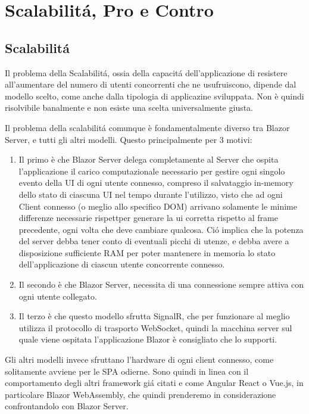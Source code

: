 \chapter{Scalabilit\'a, Pro e Contro}\label{cap:scalprocont}
\section{Scalabilit\'a}\label{sez:scalabilita}
Il problema della Scalabilit\'a, ossia della capacit\'a dell'applicazione di resistere all'aumentare del numero di utenti concorrenti che ne usufruiscono, dipende dal modello scelto, come anche dalla tipologia di applicazine sviluppata.
Non \`e quindi risolvibile banalmente e non esiste una scelta universalmente giusta.

Il problema della scalabilit\'a comunque \`e fondamentalmente diverso tra Blazor Server, e tutti gli altri modelli.
Questo principalmente per 3 motivi:
\begin{enumerate}
	\item Il primo \`e che Blazor Server delega completamente al Server che ospita l'applicazione il carico computazionale necessario per gestire ogni singolo evento della UI di ogni utente connesso, compreso il salvataggio in-memory  dello stato di ciascuna UI nel tempo durante l'utilizzo, visto che ad ogni Client connesso (o meglio allo specifico DOM) arrivano solamente le minime differenze necessarie rispettper generare la ui corretta rispetto al frame precedente, ogni volta che deve cambiare qualcosa.
	Ci\'o implica che la potenza del server debba tener conto di eventuali picchi di utenze, e debba avere a disposizione sufficiente RAM per poter mantenere in memoria lo stato dell'applicazione di ciascun utente concorrente connesso.
	
	\item Il secondo \`e che Blazor Server, necessita di una connessione sempre attiva con ogni utente collegato.
	
	\item Il terzo \`e che questo modello sfrutta SignalR, che per funzionare al meglio utilizza il protocollo di trasporto WebSocket, quindi la macchina server sul quale viene ospitata l'applicazione Blazor \`e consigliato che lo supporti.
\end{enumerate}

Gli altri modelli invece sfruttano l'hardware di ogni client connesso, come solitamente avviene per le SPA odierne.
Sono quindi in linea con il comportamento degli altri framework gi\'a citati e come Angular React o Vue.js, in particolare Blazor WebAssembly, che quindi prenderemo in considerazione confrontandolo con Blazor Server.

